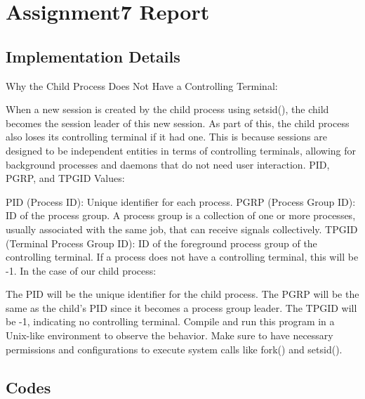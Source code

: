 \chapter{Assignment7 Report}


\section{Implementation Details}

Why the Child Process Does Not Have a Controlling Terminal:

When a new session is created by the child process using setsid(), the child becomes the session leader of this new session. As part of this, the child process also loses its controlling terminal if it had one. This is because sessions are designed to be independent entities in terms of controlling terminals, allowing for background processes and daemons that do not need user interaction.
PID, PGRP, and TPGID Values:

PID (Process ID): Unique identifier for each process.
PGRP (Process Group ID): ID of the process group. A process group is a collection of one or more processes, usually associated with the same job, that can receive signals collectively.
TPGID (Terminal Process Group ID): ID of the foreground process group of the controlling terminal. If a process does not have a controlling terminal, this will be -1.
In the case of our child process:

The PID will be the unique identifier for the child process.
The PGRP will be the same as the child's PID since it becomes a process group leader.
The TPGID will be -1, indicating no controlling terminal.
Compile and run this program in a Unix-like environment to observe the behavior. Make sure to have necessary permissions and configurations to execute system calls like fork() and setsid().

\newpage
\section{Codes}



\newpage


